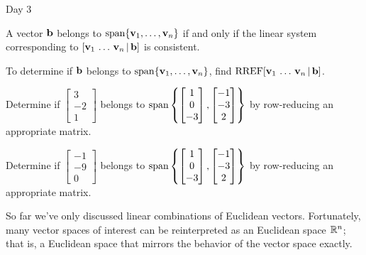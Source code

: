 
\begin{applicationActivities}{Day 3}

\begin{fact}
  A vector \(\mathbf b\) belongs to
  \(\operatorname{span}\{\mathbf v_1,\dots,\mathbf v_n\}\) if and only if
  the linear system corresponding to
  \([\mathbf v_1\,\dots\,\mathbf v_n \,|\, \mathbf b]\)
  is consistent.
\end{fact}

\begin{remark}
  To determine if \(\mathbf b\) belongs to
  \(\operatorname{span}\{\mathbf v_1,\dots,\mathbf v_n\}\), find
  \(\operatorname{RREF}[\mathbf v_1\,\dots\,\mathbf v_n \,|\, \mathbf b]\).
\end{remark}

\begin{activity}{5}
  Determine if
  \(\begin{bmatrix}3\\-2\\1\end{bmatrix}\) belongs to
  \(\operatorname{span}\left\{\begin{bmatrix}1\\0\\-3\end{bmatrix},
  \begin{bmatrix}-1\\-3\\2\end{bmatrix}\right\}\)
  by row-reducing an appropriate matrix.
\end{activity}

\begin{activity}{5}
  Determine if
  \(\begin{bmatrix}-1\\-9\\0\end{bmatrix}\) belongs to
  \(\operatorname{span}\left\{\begin{bmatrix}1\\0\\-3\end{bmatrix},
  \begin{bmatrix}-1\\-3\\2\end{bmatrix}\right\}\)
  by row-reducing an appropriate matrix.
\end{activity}


\begin{observation}
  So far we've only discussed linear combinations of Euclidean vectors.
  Fortunately, many vector spaces of interest can be reinterpreted as an
   Euclidean space \(\mathbb{R}^n\); that is, a Euclidean space
  that mirrors the behavior of the vector space exactly.
\end{observation}


\end{applicationActivities}
